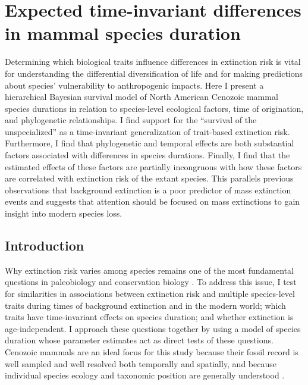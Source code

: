 \chapter{Expected time-invariant differences in mammal species duration} \label{ch:death_taxa}

\begin{section_abstract}
 Determining which biological traits influence differences in extinction risk is vital for understanding the differential diversification of life and for making predictions about species' vulnerability to anthropogenic impacts. Here I present a hierarchical Bayesian survival model of North American Cenozoic mammal species durations in relation to species-level ecological factors, time of origination, and phylogenetic relationships. I find support for the ``survival of the unspecialized'' as a time-invariant generalization of trait-based extinction risk. Furthermore, I find that phylogenetic and temporal effects are both substantial factors associated with differences in species durations. Finally, I find that the estimated effects of these factors are partially incongruous with how these factors are correlated with extinction risk of the extant species. This parallels previous observations that background extinction is a poor predictor of mass extinction events and suggests that attention should be focused on mass extinctions to gain insight into modern species loss.
\end{section_abstract}


\section{Introduction}
Why extinction risk varies among species remains one of the most fundamental questions in paleobiology and conservation biology \cite{Simpson1944,VanValen1973,Raup1994,Quental2013,Wagner2014b}. To address this issue, I test for similarities in associations between extinction risk and multiple species-level traits during times of background extinction and in the modern world; which traits have time-invariant effects on species duration; and whether extinction is age-independent. I approach these questions together by using a model of species duration whose parameter estimates act as direct tests of these questions. Cenozoic mammals are an ideal focus for this study because their fossil record is well sampled and well resolved both temporally and spatially, and because individual species ecology and taxonomic position are generally understood \cite{Simpson1944,Quental2013,Alroy2009,Liow2008,Smith2004,Tomiya2013,Marcot2014}. 

